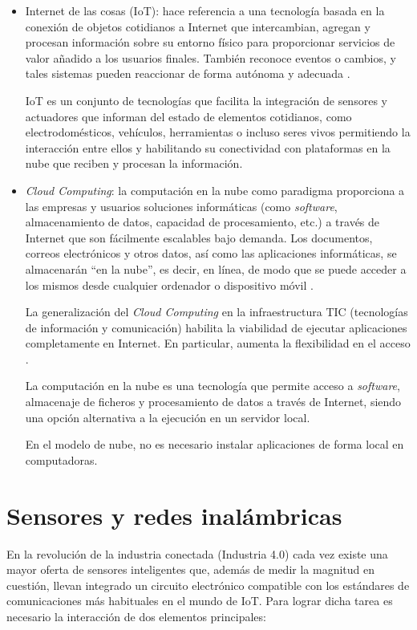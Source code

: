 \begin{itemize}
\item Internet de las cosas (IoT): hace referencia a una tecnología basada en la conexión de objetos cotidianos a Internet que intercambian, agregan y procesan información sobre su entorno físico para proporcionar servicios de valor añadido a los usuarios finales. También reconoce eventos o cambios, y tales sistemas pueden reaccionar de forma autónoma y adecuada \citep{BOOK:1}.

IoT es un conjunto de tecnologías que facilita la integración de sensores y actuadores que informan del estado de elementos cotidianos, como electrodomésticos, vehículos, herramientas o incluso seres vivos permitiendo la interacción entre ellos y habilitando su conectividad con plataformas en la nube que reciben y procesan la información.

\item \emph{Cloud Computing}: la computación en la nube como paradigma proporciona a las empresas y usuarios soluciones informáticas (como \emph{software}, almacenamiento de datos, capacidad de procesamiento, etc.) a través de Internet que son fácilmente escalables bajo demanda. Los documentos, correos electrónicos y otros datos, así como las aplicaciones informáticas, se almacenarán ``en la nube'', es decir, en línea, de modo que se puede acceder a los mismos desde cualquier ordenador o dispositivo móvil \citep{BOOK:1}.

La generalización del \emph{Cloud Computing} en la infraestructura TIC (tecnologías de información y comunicación) habilita la viabilidad de ejecutar aplicaciones completamente en Internet. En particular, aumenta la flexibilidad en el acceso \citep{BOOK:1}.

La computación en la nube es una tecnología que permite acceso a \emph{software}, almacenaje de ficheros y procesamiento de datos a través de Internet, siendo una opción alternativa a la ejecución en un servidor local. 

En el modelo de nube, no es necesario instalar aplicaciones de forma local en computadoras.

\end{itemize}

\section{Sensores y redes inalámbricas}

En la revolución de la industria conectada (Industria 4.0) \citep{WEBSITE:31}  cada vez existe una mayor oferta de sensores inteligentes que, además de medir la magnitud en cuestión, llevan integrado un circuito electrónico compatible con los estándares de comunicaciones más habituales en el mundo de IoT. Para lograr dicha tarea es necesario la interacción de dos elementos principales:

